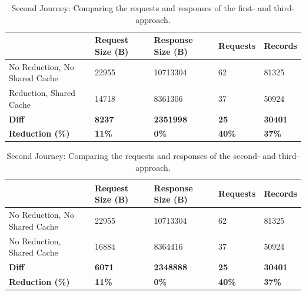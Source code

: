 \ifshowTables
\begin{table}[H]
  \begin{tabular}{|l|l|l|l|l|}
  \hline
  & Request Size (B) & Response Size (B) & Requests & Records \\
  \hline
  No Reduction, No Shared Cache & 22955 & 10713304 & 62 & 81325 \\
  \hline
  Reduction, Shared Cache & 14718 & 8361306 & 37 & 50924 \\
  \hline
  \hline
  \textbf{Diff} & \textbf{8237} & \textbf{2351998} & \textbf{25} & \textbf{30401} \\
  \hline
  \textbf{Reduction (\%)} & \textbf{11\%} & \textbf{0\%} & \textbf{40\%} & \textbf{37\%} \\
  \hline
  \end{tabular}
  \caption{Second Journey: Comparing the requests and responses of the first- and third-approach.}\label{table:results:size-comparison-second-path-no-cache-no-reduction-cache-reduction}
\end{table}
\fi

\ifshowTables
\begin{table}[H]
  \begin{tabular}{|l|l|l|l|l|}
  \hline
  & Request Size (B) & Response Size (B) & Requests & Records \\
  \hline
  No Reduction, No Shared Cache & 22955 & 10713304 & 62 & 81325 \\
  \hline
  No Reduction, Shared Cache & 16884 & 8364416 & 37 & 50924 \\
  \hline
  \hline
  \textbf{Diff} & \textbf{6071} & \textbf{2348888} & \textbf{25} & \textbf{30401} \\
  \hline
  \textbf{Reduction (\%)} & \textbf{11\%} & \textbf{0\%} & \textbf{40\%} & \textbf{37\%} \\
  \hline
  \end{tabular}
  \caption{Second Journey: Comparing the requests and responses of the second- and third-approach.}\label{table:results:size-comparison-second-path-cache-no-reduction-cache-reduction}
\end{table}
\fi